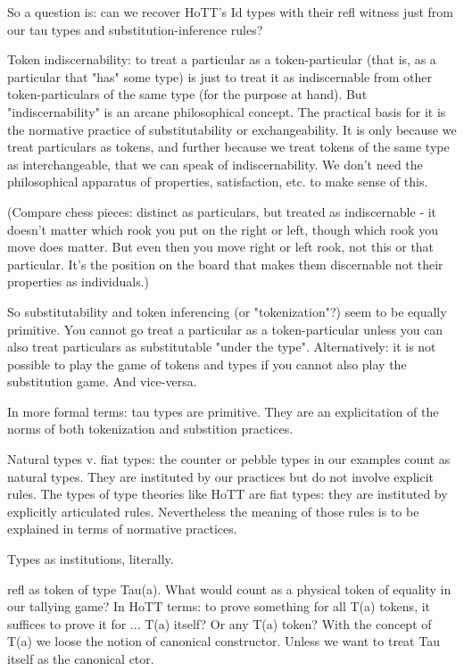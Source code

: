 \documentclass{article}
\begin{document}
So a question is: can we recover HoTT's Id types with their refl
witness just from our tau types and substitution-inference rules?


Token indiscernability: to treat a particular as a token-particular
(that is, as a particular that "has" some type) is just to treat it as
indiscernable from other token-particulars of the same type (for the
purpose at hand).  But "indiscernability" is an arcane philosophical
concept.  The practical basis for it is the normative practice of
substitutability or exchangeability.  It is only because we treat
particulars as tokens, and further because we treat tokens of the same
type as interchangeable, that we can speak of indiscernability.  We
don't need the philosophical apparatus of properties, satisfaction,
etc. to make sense of this.

(Compare chess pieces: distinct as particulars, but treated as
indiscernable - it doesn't matter which rook you put on the right or
left, though which rook you move does matter.  But even then you move
right or left rook, not this or that particular.  It's the position on
the board that makes them discernable not their properties as
individuals.)

So substitutability and token inferencing (or "tokenization"?) seem to
be equally primitive.  You cannot go treat a particular as a
token-particular unless you can also treat particulars as
substitutable "under the type".  Alternatively: it is not possible to
play the game of tokens and types if you cannot also play the
substitution game.  And vice-versa.

In more formal terms: tau types are primitive.  They are an
explicitation of the norms of both tokenization and substition
practices.

Natural types v. fiat types: the counter or pebble types in our
examples count as natural types.  They are instituted by our practices
but do not involve explicit rules.  The types of type theories like
HoTT are fiat types: they are instituted by explicitly articulated
rules.  Nevertheless the meaning of those rules is to be
explained in terms of normative practices.

Types as institutions, literally.

refl as token of type Tau(a).  What would count as a physical token of
equality in our tallying game?  In HoTT terms: to prove something for
all T(a) tokens, it suffices to prove it for ... T(a) itself?  Or any
T(a) token?  With the concept of T(a) we loose the notion of canonical
constructor.  Unless we want to treat Tau itself as the canonical
ctor.
\end{document}
